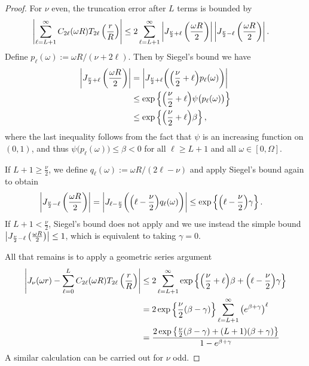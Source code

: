 \begin{proof}
    For $\nu$ even, the truncation error after $L$ terms is bounded by
    \begin{align}
        \left|\sum_{\ell=L+1}^\infty C_{2\ell}(\omega R) T_{2\ell}\left( \frac{r}{R} \right)\right|
        &\leq 2\sum_{\ell=L+1}^\infty \left|J_{\frac{\nu}{2} + \ell}\left(\frac{\omega R}{2}\right)\right| \left|J_{\frac{\nu}{2} - \ell}\left(\frac{\omega R}{2}\right)\right|.
    \end{align}
    Define $p_\ell(\omega) := \omega R / (\nu + 2\ell)$. Then by Siegel's bound
    \cite[10.14.5]{olver2010nist} we have
    \begin{align}
        \left|J_{\frac{\nu}{2} + \ell}\left(\frac{\omega R}{2}\right)\right|
        &= \left|J_{\frac{\nu}{2} + \ell}\bigg(\Big(\frac{\nu}{2} + \ell\Big) p_\ell(\omega)\bigg)\right| \\
        &\leq \exp\left\{ \Big(\frac{\nu}{2} + \ell\Big) \psi\big(p_\ell(\omega)\big)\right\} \\
        &\leq \exp\left\{ \Big(\frac{\nu}{2} + \ell\Big) \beta \right\},
    \end{align}
    where the last inequality follows from the fact that $\psi$ is an increasing
    function on $(0,1)$, and thus $\psi\big(p_\ell(\omega)\big) \leq \beta < 0$
    for all $\ell \geq L+1$ and all $\omega \in [0, \Omega]$. 
    
    If $L+1 \geq \frac{\nu}{2}$, we define $q_\ell(\omega) := \omega R / (2\ell
    - \nu)$ and apply Siegel's bound again to obtain
    \begin{align}
        \left|J_{\frac{\nu}{2} - \ell}\left(\frac{\omega R}{2}\right)\right|
        &= \left|J_{\ell - \frac{\nu}{2}}\bigg(\Big(\ell - \frac{\nu}{2}\Big) q_\ell(\omega)\bigg)\right| 
        \leq \exp\left\{ \Big(\ell - \frac{\nu}{2}\Big) \gamma \right\}.
    \end{align}
    If $L+1 < \frac{\nu}{2}$, Siegel's bound does not apply and we use instead
    the simple bound $\left|J_{\frac{\nu}{2} - \ell}\left(\frac{\omega
    R}{2}\right)\right| \leq 1$, which is equivalent to taking $\gamma = 0$. 

    All that remains is to apply a geometric series argument
    \begin{align}
        \left|J_\nu(\omega r) - \sum_{\ell=0}^L C_{2\ell}(\omega R) T_{2\ell}\left( \frac{r}{R} \right)\right|
        &\leq 2\sum_{\ell=L+1}^\infty \exp\left\{ \Big(\frac{\nu}{2} + \ell\Big) \beta + \Big(\ell - \frac{\nu}{2}\Big) \gamma \right\} \\
        &= 2\exp\left\{\frac{\nu}{2}(\beta - \gamma)\right\} \sum_{\ell=L+1}^\infty \left( e^{\beta + \gamma} \right)^\ell \\
        &= \frac{2\exp\left\{ \frac{\nu}{2}(\beta - \gamma) + (L+1)(\beta + \gamma) \right\}}{1 - e^{\beta + \gamma}}
    \end{align}
    A similar calculation can be carried out for $\nu$ odd.
\end{proof}

